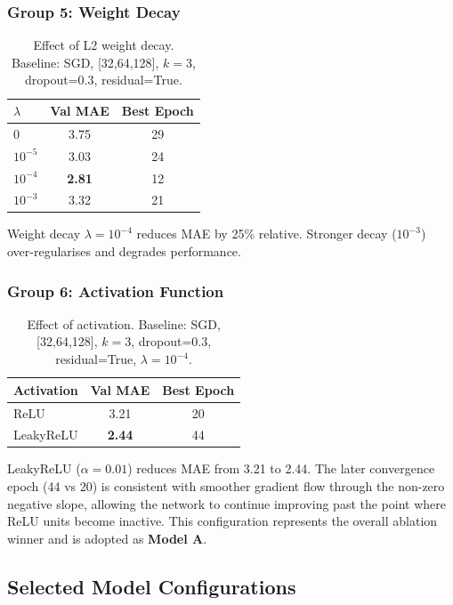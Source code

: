 \documentclass[11pt,a4paper]{article}
\begin{document}
\subsubsection{Group 5: Weight Decay}

\begin{table}[h]
\centering
\caption{Effect of L2 weight decay. Baseline: SGD, [32,64,128], $k=3$, dropout=0.3, residual=True.}
\begin{tabular}{lcc}
\toprule
$\lambda$ & Val MAE & Best Epoch \\
\midrule
$0$          & 3.75 & 29 \\
$10^{-5}$    & 3.03 & 24 \\
$10^{-4}$    & \textbf{2.81} & 12 \\
$10^{-3}$    & 3.32 & 21 \\
\bottomrule
\end{tabular}
\end{table}

Weight decay $\lambda = 10^{-4}$ reduces MAE by 25\% relative. Stronger decay
($10^{-3}$) over-regularises and degrades performance.

\subsubsection{Group 6: Activation Function}

\begin{table}[h]
\centering
\caption{Effect of activation. Baseline: SGD, [32,64,128], $k=3$, dropout=0.3, residual=True, $\lambda=10^{-4}$.}
\begin{tabular}{lcc}
\toprule
Activation & Val MAE & Best Epoch \\
\midrule
ReLU      & 3.21 & 20 \\
LeakyReLU & \textbf{2.44} & 44 \\
\bottomrule
\end{tabular}
\end{table}

LeakyReLU ($\alpha=0.01$) reduces MAE from 3.21 to 2.44. The later convergence epoch
(44 vs 20) is consistent with smoother gradient flow through the non-zero negative slope,
allowing the network to continue improving past the point where ReLU units become inactive.
This configuration represents the overall ablation winner and is adopted as \textbf{Model A}.

\subsection{Selected Model Configurations}
\end{document}
